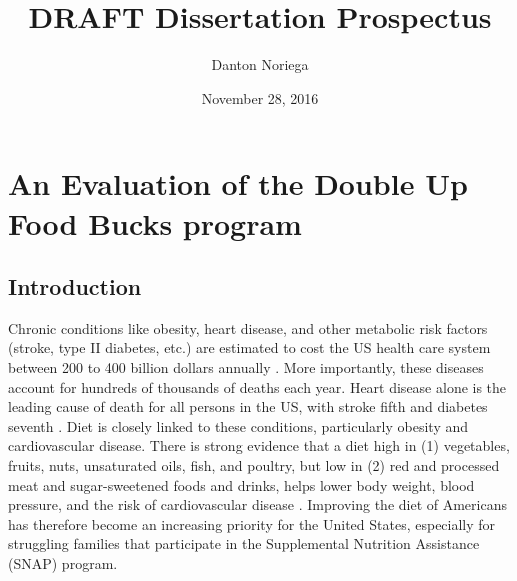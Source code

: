 \documentclass[12pt,letterpaperpaper,]{book}
\title{DRAFT Dissertation Prospectus}
\author{Danton Noriega}
\date{November 28, 2016}
\begin{document}
\maketitle

\setlength{\abovedisplayskip}{-5pt}
\setlength{\abovedisplayshortskip}{-5pt}
\mainmatter

{
\setcounter{tocdepth}{2}
\tableofcontents
}
\chapter{An Evaluation of the Double Up Food Bucks
program}\label{chapter-1}

\section*{Introduction}\label{intro-1}

Chronic conditions like obesity, heart disease, and other metabolic risk
factors (stroke, type II diabetes, etc.) are estimated to cost the US
health care system between 200 to 400 billion dollars annually
\citep{cawley_medical_2012, chatterjee_checkup_2014}. More importantly,
these diseases account for hundreds of thousands of deaths each year.
Heart disease alone is the leading cause of death for all persons in the
US, with stroke fifth and diabetes seventh
\citep{national_center_for_health_statistics_health_2015}. Diet is
closely linked to these conditions, particularly obesity and
cardiovascular disease. There is strong evidence that a diet high in (1)
vegetables, fruits, nuts, unsaturated oils, fish, and poultry, but low
in (2) red and processed meat and sugar-sweetened foods and drinks,
helps lower body weight, blood pressure, and the risk of cardiovascular
disease
\citep{mente_systematic_2009, nutrition_evidence_library_series_2014}.
Improving the diet of Americans has therefore become an increasing
priority for the United States, especially for struggling families that
participate in the Supplemental Nutrition Assistance (SNAP) program.
\end{document}
